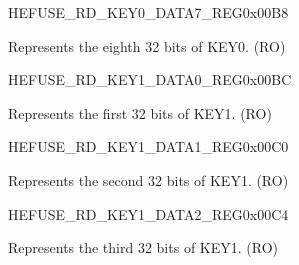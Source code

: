 \begin{register}{H}{EFUSE\_RD\_KEY0\_DATA7\_REG}{0x{}00B8}\label{regdesc:EFUSERDKEY0DATA7REG}
%
\regnewline%
\begin{regdesc}\begin{reglist}
\label{fielddesc:EFUSEKEY0DATA7}\item [EFUSE\_KEY0\_DATA7] Represents the eighth 32 bits of KEY0. (RO)
\end{reglist}\end{regdesc}
\end{register}


\begin{register}{H}{EFUSE\_RD\_KEY1\_DATA0\_REG}{0x{}00BC}\label{regdesc:EFUSERDKEY1DATA0REG}
%
\regnewline%
\begin{regdesc}\begin{reglist}
\label{fielddesc:EFUSEKEY1DATA0}\item [EFUSE\_KEY1\_DATA0] Represents the first 32 bits of KEY1. (RO)
\end{reglist}\end{regdesc}
\end{register}


\begin{register}{H}{EFUSE\_RD\_KEY1\_DATA1\_REG}{0x{}00C0}\label{regdesc:EFUSERDKEY1DATA1REG}
%
\regnewline%
\begin{regdesc}\begin{reglist}
\label{fielddesc:EFUSEKEY1DATA1}\item [EFUSE\_KEY1\_DATA1] Represents the second 32 bits of KEY1. (RO)
\end{reglist}\end{regdesc}
\end{register}


\begin{register}{H}{EFUSE\_RD\_KEY1\_DATA2\_REG}{0x{}00C4}\label{regdesc:EFUSERDKEY1DATA2REG}
%
\regnewline%
\begin{regdesc}\begin{reglist}
\label{fielddesc:EFUSEKEY1DATA2}\item [EFUSE\_KEY1\_DATA2] Represents the third 32 bits of KEY1. (RO)
\end{reglist}\end{regdesc}
\end{register}


